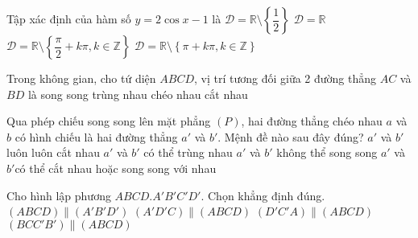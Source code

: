 \begin{ex}%
	Tập xác định của hàm số $y= 2 \cos x - 1$ là
	\choice
	{$\mathscr{D}=\mathbb{R} \setminus \left\{ \dfrac{1}{2} \right\}$}
	{\True $\mathscr{D}=\mathbb{R} $}
	{$\mathscr{D}=\mathbb{R} \setminus \left\{ \dfrac{\pi}{2} + k \pi , k \in \mathbb{Z} \right\}$}
	{$\mathscr{D}=\mathbb{R} \setminus \left\{ \pi + k \pi , k \in \mathbb{Z} \right\}$}
\end{ex}

\begin{ex}%
	Trong không gian, cho tứ diện $ABCD$, vị trí tương đối giữa 2 đường thẳng $AC$ và $BD$ là
	\choice
	{song song}
	{trùng nhau}
	{\True chéo nhau}
	{cắt nhau}
\end{ex}

\begin{ex}%
	Qua phép chiếu song song lên mặt phẳng $(P)$, hai đường thẳng chéo nhau $a$ và $b$ có hình chiếu là hai đường thẳng $a'$ và $b'$. Mệnh đề nào sau đây đúng?
	\choice
	{$a'$ và $b'$ luôn luôn cắt nhau} {$a'$ và $b'$ có thể trùng nhau} {$a'$ và $b'$ không thể song song} {\True $a'$ và $b'$có thể cắt nhau hoặc song song với nhau}
\end{ex}

\begin{ex}%
	Cho hình lập phương $ABCD.A' B' C' D'$. Chọn khẳng định đúng.
	\choice
	{\True $(ABCD) \parallel \left(A' B' D'\right)$}
	{$\left(A' D' C\right) \parallel(A B C D)$}
	{ $\left(D' C' A\right) \parallel(A B C D)$}
	{$\left(B C C' B'\right) \parallel(A B C D)$}
\end{ex}

